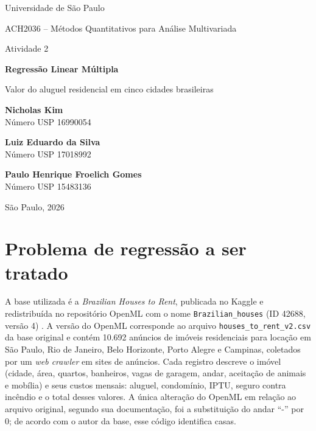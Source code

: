 \documentclass[12pt,a4paper]{article}
\begin{document}
\hypersetup{pageanchor=false}
\begin{titlepage}
  \raggedright
  \vspace*{1cm}
  {\large Universidade de São Paulo\par}
  \vspace{0.25cm}
  {\normalsize ACH2036 -- Métodos Quantitativos para Análise Multivariada\par}
  \vspace{3cm}
  {\Large Atividade 2\par}
  \vspace{0.5cm}
  {\huge\bfseries Regressão Linear Múltipla\par}
  \vspace{0.4cm}
  {\Large Valor do aluguel residencial em cinco cidades brasileiras\par}
  \vspace{2.5cm}
  {\normalsize
    \textbf{Nicholas Kim}\\
    Número USP 16990054\par
    \vspace{0.5cm}
    \textbf{Luiz Eduardo da Silva}\\
    Número USP 17018992\par
    \vspace{0.5cm}
    \textbf{Paulo Henrique Froelich Gomes}\\
    Número USP 15483136\par
  }
  \vfill
  {\normalsize São Paulo, 2026\par}
\end{titlepage}

\hypersetup{pageanchor=true}
\tableofcontents
\newpage
{}

\section{Problema de regressão a ser tratado}

A base utilizada é a \textit{Brazilian Houses to Rent}, publicada no Kaggle \cite{kaggle} e redistribuída no repositório OpenML com o nome \texttt{Brazilian\_houses} (ID 42688, versão 4) \cite{openml}. A versão do OpenML corresponde ao arquivo \texttt{houses\_to\_rent\_v2.csv} da base original e contém 10.692 anúncios de imóveis residenciais para locação em São Paulo, Rio de Janeiro, Belo Horizonte, Porto Alegre e Campinas, coletados por um \textit{web crawler} em sites de anúncios. Cada registro descreve o imóvel (cidade, área, quartos, banheiros, vagas de garagem, andar, aceitação de animais e mobília) e seus custos mensais: aluguel, condomínio, IPTU, seguro contra incêndio e o total desses valores. A única alteração do OpenML em relação ao arquivo original, segundo sua documentação, foi a substituição do andar ``-'' por 0; de acordo com o autor da base, esse código identifica casas.
\end{document}
